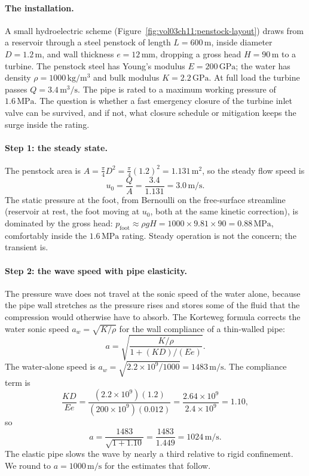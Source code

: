 \paragraph{The installation.} A small hydroelectric scheme
(Figure~\ref{fig:vol03ch11:penstock-layout}) draws from a reservoir
through a steel penstock of length $L = 600\,\si{\meter}$, inside
diameter $D = 1.2\,\si{\meter}$, and wall thickness $e =
12\,\si{\milli\meter}$, dropping a gross head $H = 90\,\si{\meter}$ to
a turbine. The penstock steel has Young's modulus $E =
200\,\text{GPa}$; the water has density $\rho =
1000\,\si{\kilogram\per\meter\cubed}$ and bulk modulus $K =
2.2\,\text{GPa}$. At full load the turbine passes $Q =
3.4\,\si{\meter\cubed\per\second}$. The pipe is rated to a maximum
working pressure of $1.6\,\text{MPa}$. The question is whether a fast
emergency closure of the turbine inlet valve can be survived, and if
not, what closure schedule or mitigation keeps the surge inside the
rating.

\paragraph{Step 1: the steady state.} The penstock area is $A =
\tfrac{\pi}{4}D^2 = \tfrac{\pi}{4}(1.2)^2 = 1.131\,\si{\meter}^2$, so
the steady flow speed is
\[
u_0 = \frac{Q}{A} = \frac{3.4}{1.131} = 3.0\,\si{\meter\per\second}.
\]
The static pressure at the foot, from Bernoulli on the free-surface
streamline (reservoir at rest, the foot moving at $u_0$, both at the
same kinetic correction), is dominated by the gross head:
$p_\text{foot} \approx \rho g H = 1000\times 9.81\times 90 =
0.88\,\text{MPa}$, comfortably inside the $1.6\,\text{MPa}$ rating.
Steady operation is not the concern; the transient is.

\paragraph{Step 2: the wave speed with pipe elasticity.} The pressure
wave does not travel at the sonic speed of the water alone, because
the pipe wall stretches as the pressure rises and stores some of the
fluid that the compression would otherwise have to absorb. The
Korteweg formula corrects the water sonic speed
$a_w = \sqrt{K/\rho}$ for the wall compliance of a thin-walled pipe:
\[
a = \sqrt{\frac{K/\rho}{1 + (K D)/(E e)}}.
\]
The water-alone speed is $a_w = \sqrt{2.2\times 10^9/1000} =
1483\,\si{\meter\per\second}$. The compliance term is
\[
\frac{K D}{E e} = \frac{(2.2\times 10^9)(1.2)}
{(200\times 10^9)(0.012)} = \frac{2.64\times 10^9}{2.4\times 10^9}
= 1.10,
\]
so
\[
a = \frac{1483}{\sqrt{1 + 1.10}} = \frac{1483}{1.449}
= 1024\,\si{\meter\per\second}.
\]
The elastic pipe slows the wave by nearly a third relative to rigid
confinement. We round to $a = 1000\,\si{\meter\per\second}$ for the
estimates that follow.

